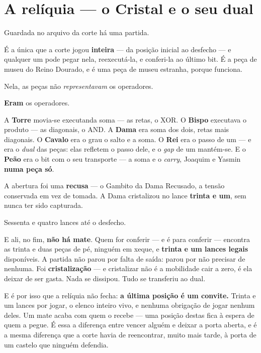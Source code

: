 \documentclass[livro.tex]{subfiles}
\begin{document}
\chapter*{A relíquia --- o Cristal e o seu dual}

Guardada no arquivo da corte há uma partida.

É a única que a corte jogou \textbf{inteira} --- da posição inicial ao desfecho --- e qualquer um pode pegar nela,
reexecutá-la, e conferi-la ao último bit. É a peça de museu do Reino Dourado, e é uma peça de museu estranha, porque
funciona.

Nela, as peças não \emph{representavam} os operadores.

\textbf{Eram} os operadores.

A \textbf{Torre} movia-se executanda soma --- as retas, o XOR. O \textbf{Bispo} executava o produto --- as
diagonais, o AND. A \textbf{Dama} era soma dos dois, retas mais diagonais. O \textbf{Cavalo} era o grau
o salto e a soma. O \textbf{Rei} era o passo de um --- e era o \emph{dual} das peças: elas refletem o passo dele, e o
\emph{gap} de um mantém-se. E o \textbf{Peão} era o bit com o seu transporte --- a soma e o \emph{carry},
Joaquim e Yasmin \textbf{numa peça só}.

A abertura foi uma \textbf{recusa} --- o Gambito da Dama Recusado, a tensão conservada em
vez de tomada. A Dama cristalizou no lance \textbf{trinta e um}, sem nunca ter sido capturada.

Sessenta e quatro lances até o desfecho.

E ali, no fim, \textbf{não há mate}. Quem for conferir --- e é para conferir --- encontra as trinta e duas peças
de pé, ninguém em xeque, e \textbf{trinta e um lances legais} disponíveis. A partida não parou por falta de saída:
parou por não precisar de nenhuma. Foi \textbf{cristalização} --- e cristalizar não é a mobilidade cair a zero, é
ela deixar de ser gasta. Nada se dissipou. Tudo se transferiu ao dual.

\medskip
\noindent E é por isso que a relíquia não fecha: \textbf{a última posição é um convite.} Trinta e um lances por
jogar, o elenco inteiro vivo, e nenhuma obrigação de jogar nenhum deles. Um mate acaba com quem o recebe --- uma
posição destas fica à espera de quem a pegue. É essa a diferença entre vencer alguém e deixar a porta aberta, e é a
mesma diferença que a corte havia de reencontrar, muito mais tarde, à porta de um castelo que ninguém defendia.
\end{document}
